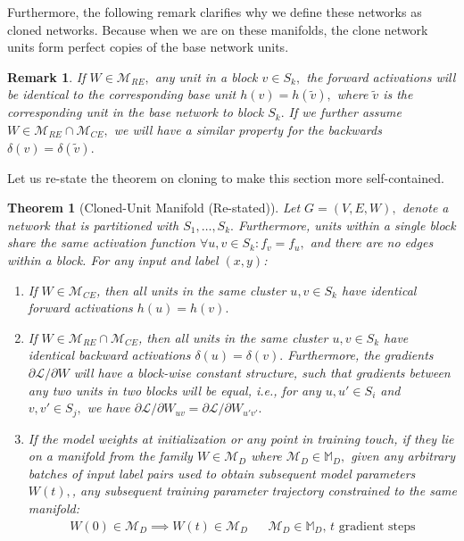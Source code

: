 \documentclass{article}
\newcommand{\Loss}{\mathcal{L}}
\newcommand{\ManifoldD}{\mathcal{M}_{D}}
\newcommand{\ManifoldRE}{\mathcal{M}_{RE}}
\newcommand{\ManifoldCE}{\mathcal{M}_{CE}}
\newtheorem{theorem}{Theorem}[section]
\newtheorem{remark}{Remark}[section]
\numberwithin{figure}{section}
\begin{document}
Furthermore, the following remark clarifies why we define these networks as cloned networks. Because when we are on these manifolds, the clone network units form perfect copies of the base network units. 
\begin{remark}
    If $W \in \ManifoldRE,$ any unit in a block $v \in S_k,$ the forward activations will be identical to the corresponding base unit $h(v) = h(\tilde{v}),$ where $\tilde{v}$ is the corresponding unit in the base network to block $S_k.$ If we further assume  $W \in \ManifoldRE\cap \ManifoldCE,$ we will have a similar property for the backwards $\delta (v) = \delta (\tilde{v}).$
\end{remark}
Let us re-state the theorem on cloning to make this section more self-contained. 
\begin{theorem}[Cloned-Unit Manifold (Re-stated)]
\label{prop:cloned_manifold_restated}
Let $G=(V,E,W),$ denote a network that is partitioned with $S_1,\dots, S_k. $ Furthermore, units within a single block share the same activation function $\forall u,v\in S_k: f_v = f_u,$ and there are no edges within a block. 
For any input and label $(x,y)$:
    \begin{enumerate}
        \item If $W \in \ManifoldCE$, then all units in the same cluster $u,v \in S_k$  have identical forward activations $h(u) = h(v).$
        \item If $W \in \ManifoldRE \cap \ManifoldCE$, then all units in the same cluster $u,v \in S_k$  have identical backward activations $\delta(u) = \delta(v).$ Furthermore, the gradients $\partial \Loss/\partial W$ will have a block-wise constant structure, such that gradients between any two units in two blocks will be equal, i.e., for any $u,u'\in S_i$ and $v,v'\in S_j,$ we have $\partial \Loss/\partial W_{uv} = \partial \Loss/\partial W_{u'v'}.$  
        \item If the model weights at initialization or any point in training touch, if they lie on a manifold from the family  $W\in \ManifoldD$ where $\ManifoldD \in \mathbb{M}_D,$ given any arbitrary batches of input label pairs used to obtain subsequent model parameters $W(t), $, any subsequent training parameter trajectory constrained to the same manifold:
    \begin{align*}
    W(0)\in \ManifoldD \implies    W(t) \in \ManifoldD && \text{$\ManifoldD\in \mathbb{M}_D$, $t$ gradient steps}
    \end{align*}
\end{enumerate}
\end{theorem}
\end{document}
